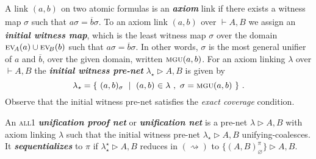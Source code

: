 \documentclass[UKenglish]{lipics-v2016}
\makeatletter
\theoremstyle{plain}
\newcommand\defn[1]{\textit{\textbf{#1}}}
\newcommand\all{\textsc{all}}
\newcommand\ex[2][{}]{\textsc{ev}_{#1}(#2)}
\newcommand\+{+}
\renewcommand\*{\times}
\newcommand\dual[1]{\overline{#1}}
\newcommand\seq[2]{{\vdash}#1,#2}
\newcommand\Seq{\vphantom(\seq}
\newcommand\Prf[3]{\deduce{\Seq{#2}{#3}}{\vphantom(#1}}
\newcommand\net[3]{#1\triangleright #2,#3}
\newcommand\mgu{\textsc{mgu}}
\newcommand\coh{\smallfrown}
\newcommand\join{\vee}
\newcommand\init[2]{\mgu(#1,#2)}
\newcommand\link[3][\sigma]{(#2,#3)_{#1}}
\newcommand\ucoal{\rightsquigarrow}
\newcommand\srr[1]{
  \ifx#1+\expandafter\@srr\else
  \ifx#1*\*\mathrm S\else
  \ifx#1!\forall\mathrm S\else
  \ifx#1?\exists\mathrm S\else 
  \ifx#11\mathrm{axS}\else
  #1\mathrm S  \fi\fi\fi\fi\fi
}
\newcommand\@srr[1]{+\mathrm S,{#1}}
\newcommand\urr[1]{
  \ifx#1+\expandafter\@urr\else
  \ifx#1*\*\mathrm U\else
  \ifx#1!\forall\mathrm U\else
  \ifx#1?\exists\mathrm U\else 
  \ifx#11\mathrm{axU}\else
  #1\mathrm U
  \fi\fi\fi\fi\fi
}
\newcommand\@urr[1]{+\mathrm U,{#1}}
\makeatother
\begin{document}
%
A link $\link[]ab$ on two atomic formulas is an \defn{axiom} link if there exists a witness map $\sigma$ such that $a\sigma=\dual b\sigma$. To an axiom link $\link[]ab$ over $\seq AB$ we assign an \defn{initial witness map}, which is the least witness map $\sigma$ over the domain $\ex[\!A]a\cup\ex[\!B]b$ such that $a\sigma=\dual b\sigma$. In other words, $\sigma$ is the most general unifier of $a$ and $\dual b$, over the given domain, written $\init ab$. For an axiom linking $\lambda$ over $\seq AB$ the \defn{initial witness pre-net} $\net{\lambda_\star}AB$ is given by
\[
	\lambda_\star = \{~\link ab~\mid~\link[]ab\in\lambda~,~\sigma=\init ab~\}~.
\]
Observe that the initial witness pre-net satisfies the \emph{exact coverage} condition.


\begin{definition}
An \all1 \defn{unification proof net} or \defn{unification net} is a pre-net $\net\lambda AB$ with axiom linking $\lambda$ such that the initial witness pre-net $\net{\lambda_\star}AB$ unifying-coalesces. It \defn{sequentializes} to $\pi$ if $\net{\lambda^\star_\star}AB$ reduces in $(\ucoal)$ to $\net{\{\link[\varnothing]AB^\pi\}}AB$.
\end{definition}
\end{document}

